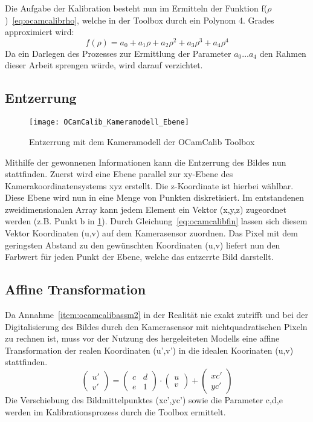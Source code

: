 Die Aufgabe der Kalibration besteht nun im Ermitteln der Funktion f($\rho$)~\eqref{eq:ocamcalibrho}, welche in der Toolbox durch ein Polynom 4. Grades approximiert wird:
\begin{equation}
\label{eq:ocamcalibrho}
 f(\rho) = a_0 + a_1 \rho + a_2 \rho^2 + a_3 \rho^3 + a_4 \rho^4
\end{equation}
Da ein Darlegen des Prozesses zur Ermittlung der Parameter \(a_0 \dots a_4 \)  den Rahmen dieser Arbeit sprengen würde, wird darauf verzichtet.

\subsection{Entzerrung}

\begin{figure}[H]
  \centering
  \texttt{[image: OCamCalib\_Kameramodell\_Ebene]}
  \caption{Entzerrung mit dem Kameramodell der OCamCalib Toolbox}
  \label{fig:kameramodell_entzerrung}
\end{figure}

Mithilfe der gewonnenen Informationen kann die Entzerrung des Bildes nun stattfinden. Zuerst wird eine Ebene parallel zur xy-Ebene des Kamerakoordinatensystems xyz erstellt. Die z-Koordinate ist hierbei wählbar. Diese Ebene wird nun in eine Menge von Punkten diskretisiert. Im entstandenen zweidimensionalen Array kann jedem Element ein Vektor (x,y,z) zugeordnet werden  (z.B. Punkt b in \ref{fig:kameramodell_entzerrung}). Durch Gleichung~\eqref{eq:ocamcalibfin} lassen sich diesem Vektor Koordinaten (u,v) auf dem Kamerasensor zuordnen. Das Pixel mit dem geringsten Abstand zu den gewünschten Koordinaten (u,v) liefert nun den Farbwert für jeden Punkt der Ebene, welche das entzerrte Bild darstellt.

\subsection{Affine Transformation}
Da Annahme~\ref{item:ocamcalibassm2} in der Realität nie exakt zutrifft  und bei der Digitalisierung des Bildes durch den Kamerasensor mit nichtquadratischen Pixeln zu rechnen ist, muss vor der Nutzung des hergeleiteten Modells eine affine Transformation der realen Koordinaten (u',v') in die idealen Koorinaten (u,v) stattfinden.
\begin{equation}
\begin{pmatrix}
u' \\ v' 
\end{pmatrix}
=
\begin{pmatrix}
 c & d \\
 e & 1 
\end{pmatrix}
\cdot
\begin{pmatrix}
u \\ v 
\end{pmatrix}
+
\begin{pmatrix}
xc' \\ yc' 
\end{pmatrix}
\end{equation}
 Die Verschiebung des Bildmittelpunktes (xc',yc') sowie die Parameter c,d,e werden im Kalibrationsprozess durch die Toolbox ermittelt.


